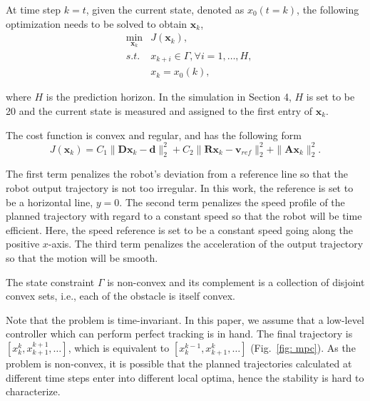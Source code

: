 \documentclass{ifacconf}
\begin{document}
At time step $k=t$, given the current state, denoted as $x_0(t=k)$, the following optimization needs to be solved to obtain $\mathbf{x}_k$,
\begin{eqnarray}
&\min_{\mathbf{x}_{k}} & J(\mathbf{x}_k),\\
&s.t.& x_{k+i}\in\Gamma,\forall i=1,\ldots,H,\\
&&         x_{k}=x_0(k),
\end{eqnarray}

where $H$ is the prediction horizon. In the simulation in Section 4, $H$ is set to be 20 and the current state is measured and assigned to the first entry of $\mathbf{x}_{k}$.

\begin{assum}[Cost]
The cost function is convex and regular, and has the following form
\begin{equation}
J(\mathbf{x}_k) = C_1\|\mathbf{D}\mathbf{x}_k-\mathbf{d}\|_{2}^2 + C_2 \|\mathbf{R}\mathbf{x}_k-\mathbf{v}_{ref}\|_2^2 +\|\mathbf{A}\mathbf{x}_{k}\|_2^2.  
\end{equation}
\end{assum}

The first term penalizes the robot's deviation from a reference line so that the robot output trajectory is not too irregular. In this work, the reference is set to be a horizontal line, $y=0$. The second term penalizes the speed profile of the planned trajectory with regard to a constant speed so that the robot will be time efficient. Here, the speed reference is set to be a constant speed going along the positive $x$-axis. The third term penalizes the acceleration of the output trajectory so that the motion will be smooth.

\begin{assum}[Constraint]
The state constraint $\Gamma$ is non-convex and its complement is a collection of disjoint convex sets, i.e., each of the obstacle is itself convex.
\end{assum}

Note that the problem is time-invariant. In this paper, we assume that a low-level controller which can perform perfect tracking is in hand. The final trajectory is $[x_k^k,x_{k+1}^{k+1},\ldots]$, which is equivalent to $[x_{k}^{k-1},x_{k+1}^{k},\ldots]$ (Fig.~\ref{fig: mpc}). As the problem is non-convex, it is possible that the planned trajectories calculated at different time steps enter into different local optima, hence the stability is hard to characterize. 
\end{document}
